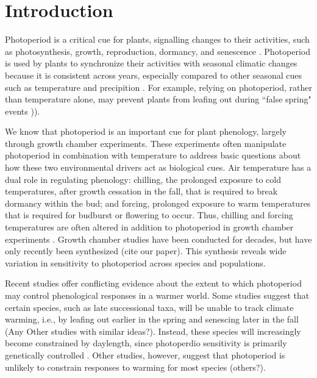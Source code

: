\documentclass{article}
\begin{document}
\section*{Introduction}
\par  Photoperiod is a critical cue for plants, signalling changes to their activities, such as photosynthesis, growth, reproduction, dormancy, and senescence \citep[e.g.,][]{Howe:1996,lagercrantz2009}. Photoperiod is used by plants to synchronize their activities with seasonal climatic changes \citep[e.g.,][]{Hsu:2011,Singh:2017,Basler:2012} because it is consistent across years, especially compared to other seasonal cues such as temperature and precipition \citep{saikkonen2012}. For example, relying on photoperiod, rather than temperature alone, may prevent plants from leafing out during ``false spring" events \citep[unusually warm periods during winter that are followed by a return of cold temperatures][] {Gu2008})). %

\par We know that photoperiod is an important cue for plant phenology, largely through growth chamber experiments.  These experiments often manipulate photoperiod in combination with temperature to address basic questions about how these two environmental drivers act as biological cues. Air temperature has a dual role in regulating phenology: chilling, the prolonged exposure to cold temperatures, after growth cessation in the fall, that is required to break dormancy within the bud; and forcing, prolonged exposure to warm temperatures that is required for budburst or flowering to occur. Thus, chilling and forcing temperatures are often altered in addition to photoperiod in growth chamber experiments \citep[e.g.,][]{Campbell:1975aa,HEIDE:1977aa,Falusi:1990aa,Spann:2004aa,Laube:2014a}. Growth chamber studies have been conducted for decades, but have only recently been synthesized (cite our paper). This synthesis reveals wide variation in sensitivity to photoperiod across species and populations. 
\par Recent studies offer conflicting evidence %
about the extent to which photoperiod may control phenological responses in a warmer world. Some studies suggest that certain species, such as late successional taxa, will be unable to track climate warming, i.e., by leafing out earlier in the spring and senescing later in the fall \citep{koerner2010b} (Any Other studies with similar ideas?). Instead, these species will increasingly become constrained by daylength, since  photoperdio sensitivity is primarily genetically controlled \citep{koerner2010b}. Other studies, however, suggest that photoperiod is unlikely to constrain responses to warming for most species \citep{zohner2016} (others?).
 
\end{document}
